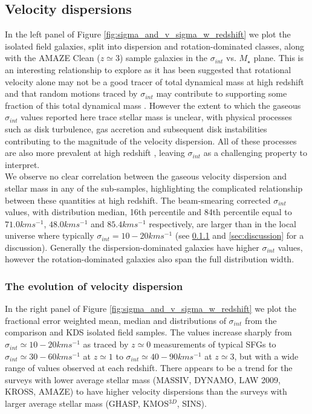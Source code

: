 \documentclass[fleqn,usenatbib]{mnras}
\begin{document}
\subsection{Velocity dispersions}\label{subsec:results_velocity_dispersions}

In the left panel of Figure \ref{fig:sigma_and_v_sigma_w_redshift} we plot the isolated field galaxies, split into dispersion and rotation-dominated classes, along with the AMAZE Clean ($z\simeq3$) sample galaxies in the $\sigma_{int}$ vs. $M_{\star}$ plane.
This is an interesting relationship to explore as it has been suggested that rotational velocity alone may not be a good tracer of total dynamical mass at high redshift and that random motions traced by $\sigma_{int}$ may contribute to supporting some fraction of this total dynamical mass \citep[e.g.][]{Kassin2007,Burkert2010,Kassin2012,Law2012b,Law2012c,Ubler2017,Genzel2017}.
However the extent to which the gaseous $\sigma_{int}$ values reported here trace stellar mass is unclear, with physical processes such as disk turbulence, gas accretion and subsequent disk instabilities contributing to the magnitude of the velocity dispersion.
All of these processes are also more prevalent at high redshift \citep{Genzel2006,ForsterSchreiber2009,Law2009,Genzel2011,Wisnioski2015,Wuyts2016b}, leaving $\sigma_{int}$ as a challenging property to interpret. \\ 

We observe no clear correlation between the gaseous velocity dispersion and stellar mass in any of the sub-samples, highlighting the complicated relationship between these quantities at high redshift.
The beam-smearing corrected $\sigma_{int}$ values, with distribution median, 16th percentile and 84th percentile equal to $71.0kms^{-1}$, $48.0kms^{-1}$ and $85.4kms^{-1}$ respectively, are larger than in the local universe where typically $\sigma_{int} = 10-20kms^{-1}$ \citep{Epinat2008a} (see \cref{subsubsec:sigma_evolution} and \cref{sec:discussion} for a discussion).
Generally the dispersion-dominated galaxies have higher $\sigma_{int}$ values, however the rotation-dominated galaxies also span the full distribution width.

\subsubsection{The evolution of velocity dispersion}\label{subsubsec:sigma_evolution}

In the right panel of Figure \ref{fig:sigma_and_v_sigma_w_redshift} we plot the fractional error weighted mean, median and distributions of $\sigma_{int}$ from the comparison and KDS isolated field samples.
The values increase sharply from $\sigma_{int}\simeq10-20kms^{-1}$ as traced by $z\simeq0$ measurements of typical SFGs to $\sigma_{int}\simeq30-60kms^{-1}$ at $z\simeq1$ to $\sigma_{int}\simeq40-90kms^{-1}$ at $z\simeq3$, but with a wide range of values observed at each redshift.
There appears to be a trend for the surveys with lower average stellar mass (MASSIV, DYNAMO, LAW 2009, KROSS, AMAZE) to have higher velocity dispersions than the surveys with larger average stellar mass (GHASP, KMOS$^{3D}$, SINS).
\end{document}
